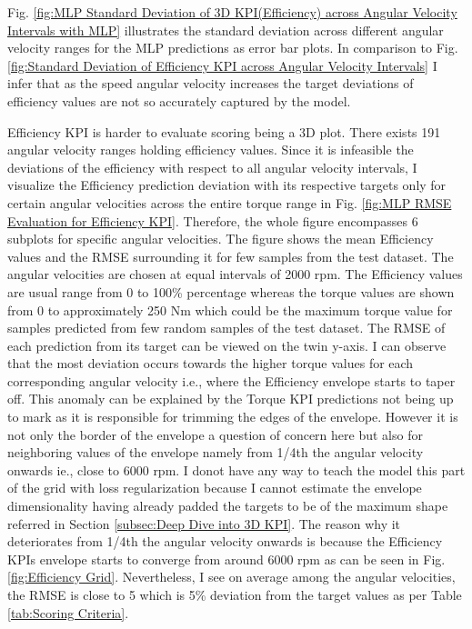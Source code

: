 \documentclass{report} %
\begin{document}
Fig. \ref{fig:MLP Standard Deviation of 3D KPI(Efficiency) across Angular Velocity Intervals with MLP} illustrates the standard deviation across different 
angular velocity ranges for the \ac{MLP} predictions as error bar plots.
In comparison to Fig. \ref{fig:Standard Deviation of Efficiency KPI across Angular Velocity Intervals} I infer that as the speed angular 
velocity increases the target deviations of efficiency values are not so accurately captured by the model.

Efficiency \ac{KPI} is harder to evaluate scoring being a 3\ac{D} plot. There exists 191 angular velocity ranges holding efficiency values.
Since it is infeasible the deviations of the efficiency with respect to all angular velocity intervals, I visualize the Efficiency prediction deviation 
with its respective targets only for certain angular velocities across the entire torque range in Fig. \ref{fig:MLP RMSE Evaluation for Efficiency KPI}. Therefore, the 
whole figure encompasses 6 subplots for specific angular velocities.
The figure shows the mean Efficiency values and the \ac{RMSE} surrounding it for few samples from the test dataset.
The angular velocities are chosen at equal intervals of 2000 rpm. The Efficiency values are usual range from 0 to 100\% percentage whereas the torque values are shown 
from 0 to approximately 250 Nm which could be the maximum torque value for samples predicted from few random samples of the test dataset.
The \ac{RMSE} of each prediction from its target can be viewed on the twin y-axis.
I can observe that the most deviation occurs towards the higher torque values for each corresponding angular velocity i.e., where the Efficiency envelope starts to taper off.
This anomaly can be explained by the Torque \ac{KPI} predictions not being up to mark as it is responsible for trimming the edges of the envelope.
However it is not only the border of the envelope a question of concern here but also for neighboring values of the envelope namely from 1/4th the 
angular velocity onwards ie., close to 6000 rpm. 
I donot have any way to teach the model this part of the grid with loss regularization because I cannot estimate the envelope dimensionality having already padded 
the targets to be of the maximum shape referred in Section \ref{subsec:Deep Dive into 3D KPI}. The reason why it deteriorates from 1/4th the angular velocity onwards is 
because the Efficiency \ac{KPI}s envelope starts to converge from around 6000 rpm as can be seen in Fig. \ref{fig:Efficiency Grid}.
Nevertheless, I see on average among the angular velocities, the \ac{RMSE} is close to 5 which is 5\% deviation from the target values as per Table \ref{tab:Scoring Criteria}.
\end{document}
